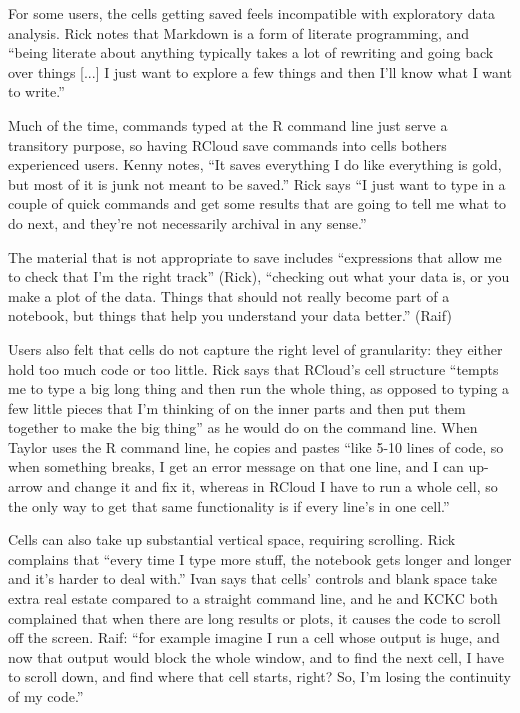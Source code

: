 For some users, the cells getting saved feels incompatible with exploratory data
analysis. Rick notes that Markdown is a form of literate programming, and
``being literate about anything typically takes a lot of rewriting and going
back over things [...] I just want to explore a few things and then I'll know
what I want to write.''

Much of the time, commands typed at the R command line just serve a transitory
purpose, so having RCloud save commands into cells bothers experienced
users. Kenny notes, ``It saves everything I do like everything is gold, but most
of it is junk not meant to be saved.'' Rick says ``I just want to type in a
couple of quick commands and get some results that are going to tell
me what to do next, and they're not necessarily archival in any sense.''

The material that is not appropriate to save includes ``expressions that allow
me to check that I'm the right track'' (Rick), ``checking out what your data is,
or you make a plot of the data. Things that should not really become part of a
notebook, but things that help you understand your data better.'' (Raif)

Users also felt that cells do not capture the right level of granularity: they
either hold too much code or too little. Rick says that RCloud's cell structure
``tempts me to type a big long thing and then run the whole thing, as opposed to
typing a few little pieces that I'm thinking of on the inner parts and then put
them together to make the big thing'' as he would do on the command line. When
Taylor uses the R command line, he copies and pastes ``like 5-10 lines of code,
so when something breaks, I get an error message on that one line, and I can
up-arrow and change it and fix it, whereas in RCloud I have to run a whole cell,
so the only way to get that same functionality is if every line's in one
cell.''

Cells can also take up substantial vertical space, requiring scrolling. Rick
complains that ``every time I type more stuff, the notebook gets longer and
longer and it's harder to deal with.'' Ivan says that cells' controls and blank
space take extra real estate compared to a straight command line, and he and
KCKC both complained that when there are long results or plots, it causes the
code to scroll off the screen. Raif: ``for example imagine I run a cell whose
output is huge, and now that output would block the whole window, and to
find the next cell, I have to scroll down, and find where that cell starts,
right? So, I'm losing the continuity of my code.''

